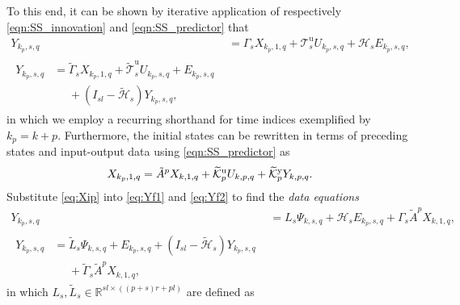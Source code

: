 To this end, it can be shown by iterative application of respectively \eqref{eqn:SS_innovation} and \eqref{eqn:SS_predictor} that%
\begin{align}
    Y_{k_p,s,q} &= \Gamma_s X_{k_p,1,q} + \mathcal{T}_s^\mathrm{u} U_{k_p,s,q} + \mathcal{H}_s E_{k_p,s,q}\label{eq:Yf1},\\
    \begin{split}%
    Y_{k_p,s,q} &= \widetilde{\Gamma}_s X_{k_p,1,q} + \widetilde{\mathcal{T}}_s^\mathrm{u} U_{k_p,s,q} + E_{k_p,s,q}\\
    &\phantom{=}+(I_{sl}-\widetilde{\mathcal{H}}_s)Y_{k_p,s,q},
    \end{split}\label{eq:Yf2}
\end{align}
in which we employ a recurring shorthand for time indices exemplified by $k_p=k+p$. Furthermore, the initial states can be rewritten in terms of preceding states and input-output data using \eqref{eqn:SS_predictor} as%
\begin{align}\label{eq:Xip}
    X_{k_p,1,q} = \tilde{A}^p X_{k,1,q} + \widetilde{\mathcal{K}}_{p}^{\mathrm{{u}}} U_{k,p,q} + \widetilde{\mathcal{K}}_{p}^{\mathrm{{y}}} Y_{k,p,q}.
\end{align}
Substitute \eqref{eq:Xip} into \eqref{eq:Yf1} and \eqref{eq:Yf2} %
to find the \textit{data equations}
\begin{align}
    Y_{k_p,s,q} &= L_s \Psi_{k,s,q} + \mathcal{H}_s E_{k_p,s,q} + \Gamma_s \tilde{A}^p X_{k,1,q},\label{eq:DataEq1}\\
    \begin{split}
    Y_{k_p,s,q} &= \widetilde{L}_s \Psi_{k,s,q} + E_{k_p,s,q} + (I_{sl}-\widetilde{\mathcal{H}}_s) Y_{k_p,s,q} \\
    &\phantom{=}+ \widetilde{\Gamma}_s \tilde{A}^p X_{k,1,q},
    \end{split}\label{eq:DataEq2}
\end{align}
in which $L_s,\widetilde{L}_s\in\mathbb{R}^{sl\times ((p+s)r+pl)}$ are defined as%
